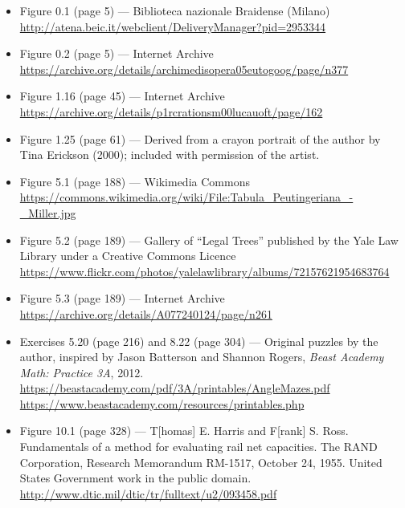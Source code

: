 \begin{itemize}
\item Figure 0.1 (page 5) — Biblioteca nazionale Braidense (Milano)\\
{\small\url{http://atena.beic.it/webclient/DeliveryManager?pid=2953344}}
\item Figure 0.2 (page 5) — Internet Archive\\
{\small\url{https://archive.org/details/archimedisopera05eutogoog/page/n377}}
\item Figure 1.16 (page 45) — Internet Archive\\
{\small\url{https://archive.org/details/p1rcrationsm00lucauoft/page/162}}
\item Figure 1.25 (page 61) — Derived from a crayon portrait of the author by Tina Erickson (2000); included with permission of the artist.
\item Figure 5.1 (page 188) — Wikimedia Commons\\
{\small\url{https://commons.wikimedia.org/wiki/File:Tabula_Peutingeriana_-_Miller.jpg}}
\item Figure 5.2 (page 189) — Gallery of “Legal Trees” published by the Yale Law Library under a Creative Commons Licence\\
{\small\url{https://www.flickr.com/photos/yalelawlibrary/albums/72157621954683764}}
\item Figure 5.3 (page 189) — Internet Archive\\
{\small\url{https://archive.org/details/A077240124/page/n261}}
\item Exercises 5.20 (page 216) and 8.22 (page 304) — Original puzzles by the author, inspired by Jason Batterson and Shannon Rogers, \textit{Beast Academy Math: Practice 3A}, 2012.\\
{\small\url{https://beastacademy.com/pdf/3A/printables/AngleMazes.pdf}}\\
{\small\url{https://www.beastacademy.com/resources/printables.php}}
\item Figure 10.1 (page 328) — T[homas] E. Harris and F[rank] S. Ross. Fundamentals of a method for evaluating rail net capacities. The RAND Corporation, Research Memorandum RM-1517, October 24, 1955. United States Government work in the public domain.\\
{\small\url{http://www.dtic.mil/dtic/tr/fulltext/u2/093458.pdf}}
\end{itemize}

